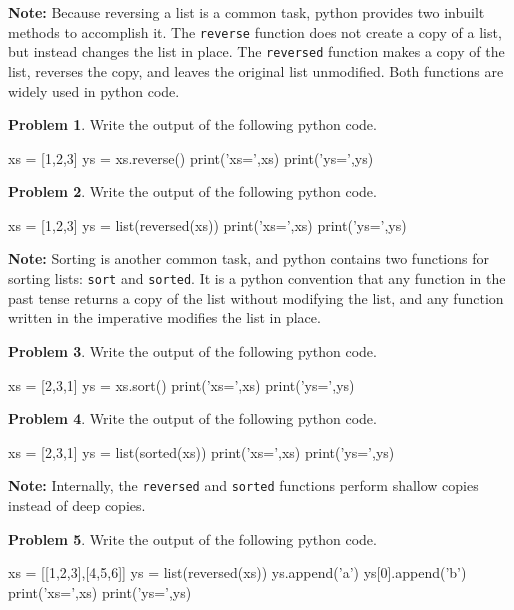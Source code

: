 \documentclass[12pt]{article}
\theoremstyle{definition}
\newtheorem{problem}{Problem}
\begin{document}
\newpage
\noindent
\textbf{Note:}
Because reversing a list is a common task,
python provides two inbuilt methods to accomplish it.
The \texttt{reverse} function does not create a copy of a list, but instead changes the list in place.
The \texttt{reversed} function makes a copy of the list, reverses the copy, and leaves the original list unmodified.
Both functions are widely used in python code.

\begin{problem}
Write the output of the following python code.
\begin{python}
xs = [1,2,3]
ys = xs.reverse()
print('xs=',xs)
print('ys=',ys)
\end{python}
\end{problem}
\vspace{2in}

\begin{problem}
Write the output of the following python code.
\begin{python}
xs = [1,2,3]
ys = list(reversed(xs))
print('xs=',xs)
print('ys=',ys)
\end{python}
\end{problem}

\newpage
\noindent
\textbf{Note:}
Sorting is another common task, and python contains two functions for sorting lists: \texttt{sort} and \texttt{sorted}.
It is a python convention that any function in the past tense returns a copy of the list without modifying the list, 
and any function written in the imperative modifies the list in place.

\begin{problem}
Write the output of the following python code.
\begin{python}
xs = [2,3,1]
ys = xs.sort()
print('xs=',xs)
print('ys=',ys)
\end{python}
\end{problem}
\vspace{2in}

\begin{problem}
Write the output of the following python code.
\begin{python}
xs = [2,3,1]
ys = list(sorted(xs))
print('xs=',xs)
print('ys=',ys)
\end{python}
\end{problem}

\newpage
\noindent
\textbf{Note:}
Internally, the \texttt{reversed} and \texttt{sorted} functions perform shallow copies instead of deep copies.

\begin{problem}
Write the output of the following python code.
\begin{python}
xs = [[1,2,3],[4,5,6]]
ys = list(reversed(xs))
ys.append('a')
ys[0].append('b')
print('xs=',xs)
print('ys=',ys)
\end{python}
\end{problem}
\vspace{2in}
\end{document}
